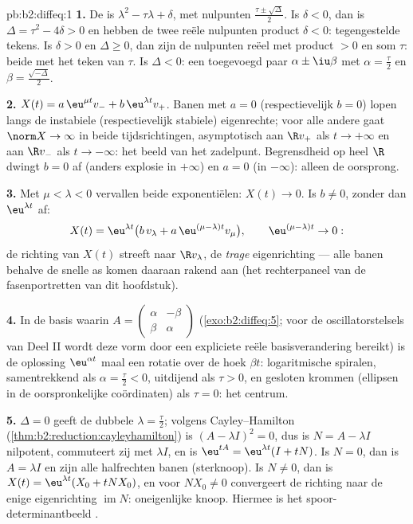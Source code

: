 \begin{solution}{pb:b2:diffeq:1}
\textbf{1.} De  is $\lambda^2 -
\tau\lambda + \delta$, met nulpunten
$\frac{\tau\pm\sqrt\Delta}{2}$. Is $\delta < 0$, dan is $\Delta =
\tau^2 - 4\delta > 0$ en hebben de twee reële nulpunten product
$\delta < 0$: tegengestelde tekens. Is $\delta > 0$ en $\Delta \geq
0$, dan zijn de nulpunten reëel met product $> 0$ en som $\tau$:
beide met het teken van $\tau$. Is $\Delta < 0$: een toegevoegd
paar $\alpha \pm \iu\beta$ met $\alpha = \frac\tau2$ en $\beta =
\frac{\sqrt{-\Delta}}2$.

\textbf{2.} $X(t) = a\,\eu^{\mu t}v_- + b\,\eu^{\lambda t}v_+$.
Banen met $a = 0$ (respectievelijk $b = 0$) lopen langs de
instabiele (respectievelijk stabiele) eigenrechte; voor alle andere
gaat $\norm X \to \infty$ in beide tijdsrichtingen, asymptotisch
aan $\R v_+$ als $t \to +\infty$ en aan $\R v_-$ als $t \to
-\infty$: het beeld van het zadelpunt. Begrensdheid op heel $\R$
dwingt $b = 0$ af (anders explosie in $+\infty$) en $a = 0$ (in
$-\infty$): alleen de oorsprong.

\textbf{3.} Met $\mu < \lambda < 0$ vervallen beide exponentiëlen:
$X(t) \to 0$. Is $b \neq 0$, zonder dan $\eu^{\lambda t}$ af:
\[
X(t) = \eu^{\lambda t}\bigl(b\,v_\lambda + a\,\eu^{(\mu -
\lambda)t}v_\mu\bigr),
\qquad \eu^{(\mu-\lambda)t} \to 0 :
\]
de richting van $X(t)$ streeft naar $\R v_\lambda$, de
\emph{trage} eigenrichting --- alle banen behalve de snelle as
komen daaraan rakend aan (het rechterpaneel van de fasenportretten
van dit hoofdstuk).

\textbf{4.} In de basis waarin $A = \begin{pmatrix} \alpha &
-\beta\\ \beta & \alpha\end{pmatrix}$ (\cref{exo:b2:diffeq:5}; voor
de oscillatorstelsels van Deel II wordt deze vorm door een
expliciete reële basisverandering bereikt) is de oplossing
$\eu^{\alpha t}$ maal een rotatie over de hoek $\beta t$:
logaritmische spiralen, samentrekkend als $\alpha = \frac\tau2 <
0$, uitdijend als $\tau > 0$, en gesloten krommen (ellipsen in de
oorspronkelijke coördinaten) als $\tau = 0$: het centrum.

\textbf{5.} $\Delta = 0$ geeft de dubbele  $\lambda =
\frac\tau2$; volgens Cayley--Hamilton
(\cref{thm:b2:reduction:cayleyhamilton}) is $(A - \lambda I)^2 =
0$, dus is $N = A - \lambda I$ nilpotent, commuteert zij met
$\lambda I$, en is $\eu^{tA} = \eu^{\lambda t}(I + tN)$. Is $N =
0$, dan is $A = \lambda I$ en zijn alle halfrechten banen
(sterknoop). Is $N \neq 0$, dan is $X(t) = \eu^{\lambda t}(X_0 +
tNX_0)$, en voor $NX_0 \neq 0$ convergeert de richting naar de
enige eigenrichting $\operatorname{im}N$: oneigenlijke knoop.
Hiermee is het spoor-determinantbeeld .


\end{solution}
